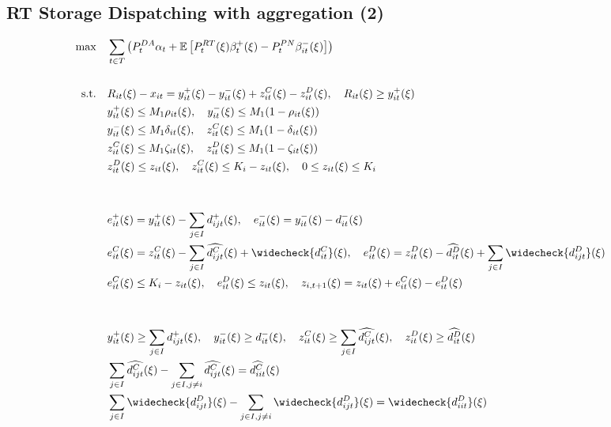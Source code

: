 \documentclass[10pt]{article}
\begin{document}
\newpage

\subsection{RT Storage Dispatching with aggregation (2)}
\begin{align*}
    \text{max} \quad &\sum_{t\in T}\left(P_t^{DA} \alpha_{t} + \mathbb{E}\left[P_t^{RT}(\xi)\beta_{t}^{+}(\xi) - P_t^{PN}\beta_{it}^{-}(\xi)\right]\right)&\\ 
    &&\\   
    \text{s.t.} \quad &R_{it}(\xi) - x_{it} = y_{it}^{+}(\xi) - y_{it}^{-}(\xi) + z^C_{it}(\xi) - z^D_{it}(\xi), \quad R_{it}(\xi) \geq y^+_{it}(\xi)&\\
    &y^+_{it}(\xi) \leq M_1 \rho_{it}(\xi), \quad y^-_{it}(\xi) \leq M_1 (1 - \rho_{it}(\xi)) &\\
    &y^-_{it}(\xi) \leq M_1 \delta_{it}(\xi), \quad z^C_{it}(\xi) \leq M_1 (1 - \delta_{it}(\xi)) &\\
    &z^C_{it}(\xi) \leq M_1 \zeta_{it}(\xi), \quad z^D_{it}(\xi) \leq M_1 (1 - \zeta_{it}(\xi)) &\\
    &z^D_{it}(\xi) \le z_{it}(\xi), \quad z^C_{it}(\xi) \le K_i-z_{it}(\xi), \quad 0 \leq z_{it}(\xi) \leq K_i &\\
    &&\\ 
    &&\\
    &e^+_{it}(\xi) = y^+_{it}(\xi) - \sum_{j \in I}d^{+}_{ijt}(\xi), \quad e^-_{it}(\xi) = y^-_{it}(\xi) - d^{-}_{it}(\xi) &\\
    &e^C_{it}(\xi) = z^C_{it}(\xi) - \sum_{j \in I}\widehat{d^{C}_{ijt}}(\xi) + \widecheck{d^{C}_{it}}(\xi), \quad e^D_{it}(\xi) = z^D_{it}(\xi) - \widehat{d^{D}_{it}}(\xi) + \sum_{j \in I}\widecheck{d^{D}_{ijt}}(\xi) &\\
    &e^C_{it}(\xi) \leq K_i - z_{it}(\xi), \quad e^D_{it}(\xi) \leq z_{it}(\xi), \quad z_{i,t+1}(\xi) = z_{it}(\xi) + e^C_{it}(\xi) - e^D_{it}(\xi) &\\
    &&\\
    &&\\
    &y^+_{it}(\xi) \geq \sum_{j \in I}d^+_{ijt}(\xi), \quad y^-_{it}(\xi) \geq d^{-}_{it}(\xi), \quad z^C_{it}(\xi) \geq \sum_{j \in I}\widehat{d^{C}_{ijt}}(\xi), \quad z^D_{it}(\xi) \geq \widehat{d^{D}_{it}}(\xi)&\\
    &\sum_{j \in I}\widehat{d^{C}_{ijt}}(\xi) - \sum_{j \in I, j \neq i} \widehat{d^{C}_{ijt}}(\xi) = \widehat{d^{C}_{iit}}(\xi) &\\
    &\sum_{j \in I}\widecheck{d^{D}_{ijt}}(\xi) - \sum_{j \in I, j \neq i} \widecheck{d^{D}_{ijt}}(\xi) = \widecheck{d^{D}_{iit}}(\xi) &\\

\end{align*}
\end{document}
